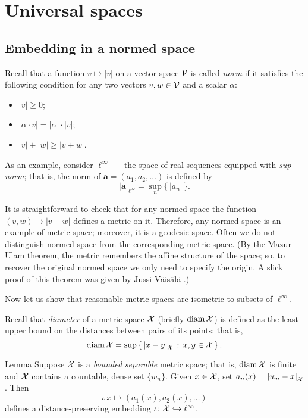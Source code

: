 \chapter{Universal spaces}

\section{Embedding in a normed space}

Recall that a function $v\mapsto |v|$ on a vector space $\mathcal{V}$ is called \emph{norm} if it satisfies the following condition for any two vectors $v,w\in \mathcal{V}$ and a scalar $\alpha$:
\begin{itemize}
\item $|v|\ge 0$;
\item $|\alpha\cdot v|=|\alpha|\cdot |v|$;
\item $|v|+|w|\ge|v+w|$.
\end{itemize}

As an example, consider \index{$\ell^\infty$}$\ell^\infty$ --- the space of real sequences equipped with \emph{sup-norm}; that is, the norm of $\bm{a}=(a_1,a_2,\dots)$ is defined by
\[|\bm{a}|_{\ell^\infty}=\sup_n\{\,|a_n|\,\}.\]


It is straightforward to check that for any normed space the function $(v,w)\mapsto |v-w|$ defines a metric on it.
Therefore, any normed space is an example of metric space;
moreover, it is a geodesic space.
Often we do not distinguish normed space from the corresponding metric space.
(By the Mazur--Ulam theorem, the metric remembers the affine structure of the space; so, to recover the original normed space we only need to specify the origin.
A slick proof of this theorem was given by Jussi V\"{a}is\"{a}l\"{a} \cite{vaisala}.)

Now let us show that reasonable metric spaces are isometric to subsets of $\ell^\infty$.

Recall that \emph{diameter} of a metric space $\mathcal{X}$ (briefly $\operatorname{\rm diam}\nolimits \mathcal{X}$) is defined as the least upper bound on the distances between pairs of its points;
that is,
\[\diam \spc{X}=\sup\set{\dist{x}{y}{\spc{X}}}{x,y\in \spc{X}}.\]



\begin{thm}{Lemma}\label{lem:frechet}
Suppose $\mathcal{X}$ is a \emph{bounded} \emph{separable} metric space;
that is, $\operatorname{\rm diam}\nolimits\mathcal{X}$ is finite and $\mathcal{X}$ contains a countable, dense set $\{w_n\}$.
Given $x\in \mathcal{X}$, set $a_n(x)=\dist{w_n}{x}{\spc{X}}$.
Then 
\[\iota\:x\mapsto (a_1(x), a_2(x),\dots)\]
defines a distance-preserving embedding $\iota\colon\mathcal{X}\hookrightarrow \ell^\infty$.
\end{thm}

